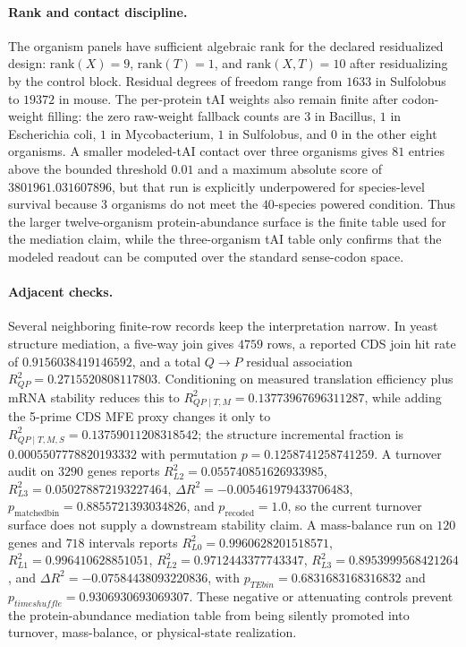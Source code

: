 \paragraph{Rank and contact discipline.}
The organism panels have sufficient algebraic rank for the declared residualized design: $\mathrm{rank}(X)=9$, $\mathrm{rank}(T)=1$, and $\mathrm{rank}(X,T)=10$ after residualizing by the control block. Residual degrees of freedom range from $1633$ in Sulfolobus to $19372$ in mouse. The per-protein tAI weights also remain finite after codon-weight filling: the zero raw-weight fallback counts are $3$ in Bacillus, $1$ in Escherichia coli, $1$ in Mycobacterium, $1$ in Sulfolobus, and $0$ in the other eight organisms. A smaller modeled-tAI contact over three organisms gives $81$ entries above the bounded threshold $0.01$ and a maximum absolute score of $3801961.031607896$, but that run is explicitly underpowered for species-level survival because $3$ organisms do not meet the $40$-species powered condition. Thus the larger twelve-organism protein-abundance surface is the finite table used for the mediation claim, while the three-organism tAI table only confirms that the modeled readout can be computed over the standard sense-codon space.

\paragraph{Adjacent checks.}
Several neighboring finite-row records keep the interpretation narrow. In yeast structure mediation, a five-way join gives $4759$ rows, a reported CDS join hit rate of $0.9156038419146592$, and a total $Q\to P$ residual association $R^2_{QP}=0.2715520808117803$. Conditioning on measured translation efficiency plus mRNA stability reduces this to $R^2_{QP\mid T,M}=0.13773967696311287$, while adding the 5-prime CDS MFE proxy changes it only to $R^2_{QP\mid T,M,S}=0.13759011208318542$; the structure incremental fraction is $0.0005507778820193332$ with permutation $p=0.1258741258741259$. A turnover audit on $3290$ genes reports $R^2_{L2}=0.055740851626933985$, $R^2_{L3}=0.050278872193227464$, $\Delta R^2=-0.005461979433706483$, $p_{\mathrm{matchedbin}}=0.8855721393034826$, and $p_{\mathrm{recoded}}=1.0$, so the current turnover surface does not supply a downstream stability claim. A mass-balance run on $120$ genes and $718$ intervals reports $R^2_{L0}=0.9960628201518571$, $R^2_{L1}=0.996410628851051$, $R^2_{L2}=0.9712443377743347$, $R^2_{L3}=0.8953999568421264$, and $\Delta R^2=-0.07584438093220836$, with $p_{TEbin}=0.6831683168316832$ and $p_{timeshuffle}=0.9306930693069307$. These negative or attenuating controls prevent the protein-abundance mediation table from being silently promoted into turnover, mass-balance, or physical-state realization.

